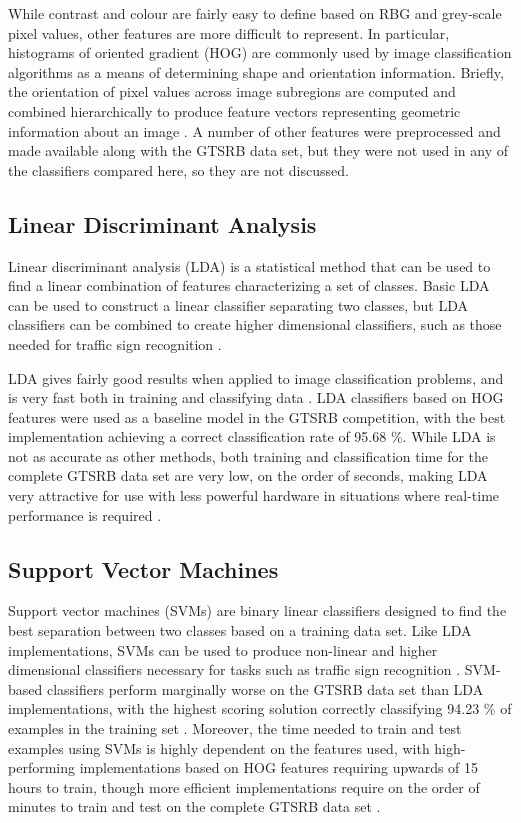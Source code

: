 \documentclass[letterpaper,twocolumn,10pt]{article}
\begin{document}
While contrast and colour are fairly easy to define based on RBG and grey-scale pixel values, other features are more difficult to represent. In particular, histograms of oriented gradient (HOG) are commonly used by image classification algorithms as a means of determining shape and orientation information. Briefly, the orientation of pixel values across image subregions are computed and combined hierarchically to produce feature vectors representing geometric information about an image \cite{stallkamp_german_2011, stallkamp_man_2012}. A number of other features were preprocessed and made available along with the GTSRB data set, but they were not used in any of the classifiers compared here, so they are not discussed.


\subsection{Linear Discriminant Analysis}

Linear discriminant analysis (LDA) is a statistical method that can be used to find a linear combination of features characterizing a set of classes. Basic LDA can be used to construct a linear classifier separating two classes, but LDA classifiers can be combined to create higher dimensional classifiers, such as those needed for traffic sign recognition \cite{xanthopoulos2013linear}.

LDA gives fairly good results when applied to image classification problems, and is very fast both in training and classifying data \cite{hastie2001linear, mathias_traffic_2013}. LDA classifiers based on HOG features were used as a baseline model in the GTSRB competition, with the best implementation achieving a correct classification rate of 95.68 \%. While LDA is not as accurate as other methods, both training and classification time for the complete GTSRB data set are very low, on the order of seconds, making LDA very attractive for use with less powerful hardware in situations where real-time performance is required \cite{mathias_traffic_2013}.

\subsection{Support Vector Machines}

Support vector machines (SVMs) are binary linear classifiers designed to find the best separation between two classes based on a training data set. Like LDA implementations, SVMs can be used to produce non-linear and higher dimensional classifiers necessary for tasks such as traffic sign recognition \cite{mathias_traffic_2013}. SVM-based classifiers perform marginally worse on the GTSRB data set than LDA implementations, with the highest scoring solution correctly classifying 94.23 \% of examples in the training set \cite{mathias_traffic_2013}. Moreover, the time needed to train and test examples using SVMs is highly dependent on the features used, with high-performing implementations based on HOG features requiring upwards of 15 hours to train, though more efficient implementations require on the order of minutes to train and test on the complete GTSRB data set \cite{stallkamp_german_2011, mathias_traffic_2013}. 
\end{document}
